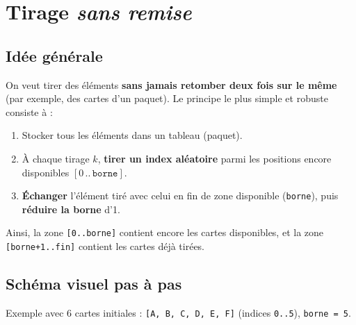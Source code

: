 \section{Tirage \emph{sans remise}}
\label{sec:tirage-sans-remise}

\noindent\textcolor{white}{}


\subsection*{Idée générale}
On veut tirer des éléments \textbf{sans jamais retomber deux fois sur le même} (par exemple, des cartes d’un paquet).  
Le principe le plus simple et robuste consiste à :
\begin{enumerate}
  \item Stocker tous les éléments dans un tableau (paquet).
  \item À chaque tirage $k$, \textbf{tirer un index aléatoire} parmi les positions encore disponibles $[0\,..\,\texttt{borne}]$.
  \item \textbf{Échanger} l’élément tiré avec celui en fin de zone disponible (\texttt{borne}), puis \textbf{réduire la borne} d’1.
\end{enumerate}
Ainsi, la zone \texttt{[0..borne]} contient encore les cartes disponibles, et la zone \texttt{[borne+1..fin]} contient les cartes déjà tirées.

\subsection*{Schéma visuel pas à pas}
Exemple avec 6 cartes initiales : \texttt{[A, B, C, D, E, F]} (indices \texttt{0..5}), \texttt{borne = 5}.

